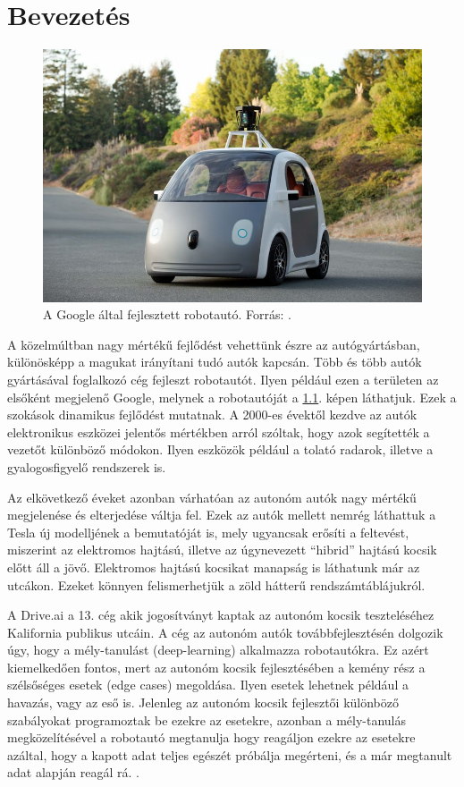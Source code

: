 \documentclass[a4paper,12pt]{report}
\begin{document}
\chapter{Bevezetés}

\begin{figure}[ht]
\centerline{
\includegraphics[width=6in]{img/googleauto}}
\caption{A Google által fejlesztett robotautó. Forrás: \cite{googlecarimage}.}
\label{googleauto}
\end{figure}

A közelmúltban nagy mértékű fejlődést vehettünk észre az autógyártásban, különösképp a magukat irányítani tudó autók kapcsán. Több és több autók gyártásával foglalkozó cég fejleszt robotautót. Ilyen például ezen a területen az elsőként megjelenő Google, melynek a robotautóját a \ref{googleauto}. képen láthatjuk. Ezek a szokások dinamikus fejlődést mutatnak. A 2000-es évektől kezdve az autók elektronikus eszközei jelentős mértékben arról szóltak, hogy azok segítették a vezetőt különböző módokon. Ilyen eszközök például a tolató radarok, illetve a gyalogosfigyelő rendszerek is. 

\vspace{2mm}
Az elkövetkező éveket azonban várhatóan az autonóm autók nagy mértékű megjelenése és elterjedése váltja fel. Ezek az autók mellett nemrég láthattuk a Tesla új modelljének a bemutatóját is, mely ugyancsak erősíti a feltevést, miszerint az elektromos hajtású, illetve az úgynevezett ``hibrid'' hajtású kocsik előtt áll a jövő. Elektromos hajtású kocsikat manapság is láthatunk már az utcákon. Ezeket könnyen felismerhetjük a zöld hátterű rendszámtáblájukról.

\vspace{2mm}
A Drive.ai a 13. cég akik jogosítványt kaptak az autonóm kocsik teszteléséhez Kalifornia publikus utcáin. A cég az autonóm autók továbbfejlesztésén dolgozik úgy, hogy a mély-tanulást (deep-learning) alkalmazza robotautókra. Ez azért kiemelkedően fontos, mert az autonóm kocsik fejlesztésében a kemény rész a szélsőséges esetek (edge cases) megoldása. Ilyen esetek lehetnek például a havazás, vagy az eső is. Jelenleg az autonóm kocsik fejlesztői különböző szabályokat programoztak be ezekre az esetekre, azonban a mély-tanulás megközelítésével a robotautó megtanulja hogy reagáljon ezekre az esetekre azáltal, hogy a kapott adat teljes egészét próbálja megérteni, és a már megtanult adat alapján reagál rá. \cite{driveai}.
\end{document}
